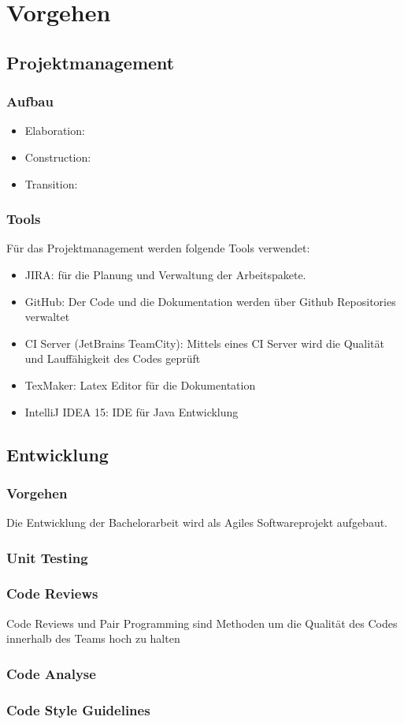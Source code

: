 \section{Vorgehen}
\subsection{Projektmanagement}
\subsubsection{Aufbau}
\begin{itemize}
	\item Elaboration: 
	\item Construction: 
	\item Transition: 
\end{itemize}
\subsubsection{Tools}
Für das Projektmanagement werden folgende Tools verwendet:
\begin{itemize}
\item JIRA: für die Planung und Verwaltung der Arbeitspakete.
\item GitHub: Der Code und die Dokumentation werden über Github Repositories verwaltet
\item CI Server (JetBrains TeamCity): Mittels eines CI Server wird die Qualität und Lauffähigkeit des Codes geprüft
\item TexMaker: Latex Editor für die Dokumentation
\item IntelliJ IDEA 15: IDE für Java Entwicklung
\end{itemize}
\subsection{Entwicklung}
\subsubsection{Vorgehen}
Die Entwicklung der Bachelorarbeit wird als Agiles Softwareprojekt aufgebaut.
\subsubsection{Unit Testing}
\subsubsection{Code Reviews}
Code Reviews und Pair Programming sind Methoden um die Qualität des Codes innerhalb des Teams hoch zu halten
\subsubsection{Code Analyse}
\subsubsection{Code Style Guidelines}